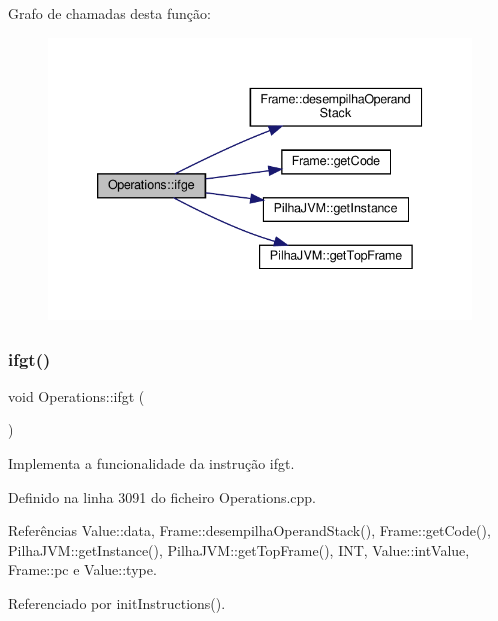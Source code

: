 Grafo de chamadas desta função\+:
\nopagebreak
\begin{figure}[H]
\begin{center}
\leavevmode
\includegraphics[width=339pt]{classOperations_a0e7cf2111ad25ee52aa329cc6ec4d38a_cgraph}
\end{center}
\end{figure}
\mbox{\label{classOperations_afff52b972f58750ea8037aeb02dd22bc}} 
\subsubsection{\texorpdfstring{ifgt()}{ifgt()}}
{\footnotesize\ttfamily void Operations\+::ifgt (\begin{DoxyParamCaption}{ }\end{DoxyParamCaption})\hspace{0.3cm}{\ttfamily [private]}}



Implementa a funcionalidade da instrução ifgt. 



Definido na linha 3091 do ficheiro Operations.\+cpp.



Referências Value\+::data, Frame\+::desempilha\+Operand\+Stack(), Frame\+::get\+Code(), Pilha\+J\+V\+M\+::get\+Instance(), Pilha\+J\+V\+M\+::get\+Top\+Frame(), I\+NT, Value\+::int\+Value, Frame\+::pc e Value\+::type.



Referenciado por init\+Instructions().

